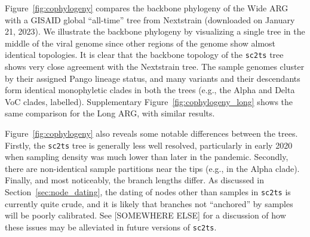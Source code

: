 \documentclass{article}
\begin{document}
Figure~\ref{fig:cophylogeny} compares the backbone phylogeny of the Wide ARG with
a GISAID global ``all-time'' tree from Nextstrain
(downloaded on January 21, 2023).
We illustrate the backbone phylogeny by visualizing
a single tree in the middle of the viral genome
since other regions of the
genome show almost identical topologies.
It is clear that the backbone topology of the \texttt{sc2ts} tree shows very close
agreement with the Nextstrain tree. The sample genomes cluster by their
assigned Pango lineage status, and many variants and their descendants form
identical monophyletic clades in both the trees (e.g., the Alpha and Delta VoC
clades, labelled).
Supplementary Figure~\ref{fig:cophylogeny_long} shows the same comparison for the Long ARG, with similar results.

Figure~\ref{fig:cophylogeny} also reveals some notable differences between the
trees. Firstly, the \texttt{sc2ts} tree is generally less well resolved,
particularly in early 2020 when sampling density was much lower than
later in the pandemic.
Secondly, there are non-identical sample partitions
near the tips (e.g., in the Alpha clade).
Finally, and most noticeably, the branch lengths differ.
As discussed in Section~\ref{sec:node_dating}, the dating of nodes
other than samples in \texttt{sc2ts} is currently quite crude, and
it is likely that branches not ``anchored'' by samples will be
poorly calibrated. See [SOMEWHERE ELSE] for a discussion of how
these issues may be alleviated in future versions of \texttt{sc2ts}.


\end{document}
